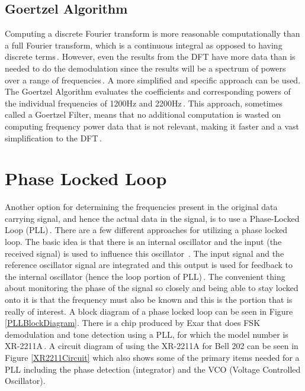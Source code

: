 \subsection{Goertzel Algorithm}
Computing a discrete Fourier transform is more reasonable computationally than a full Fourier transform, which is a continuous integral as opposed to having discrete terms\,\cite{WikipediaFT}. However, even the results from the DFT have more data than is needed to do the demodulation since the results will be a spectrum of powers over a range of frequencies\,\cite{WikipediaDFT,WikipediaFFT}. A more simplified and specific approach can be used. The Goertzel Algorithm evaluates the coefficients and corresponding powers of the individual frequencies of 1200Hz and 2200Hz\,\cite{WikipediaGA,Elmenreich2011}. This approach, sometimes called a Goertzel Filter, means that no additional computation is wasted on computing frequency power data that is not relevant, making it faster and a vast simplification to the DFT\,\cite{SanjitK1993}.

\section{Phase Locked Loop}
Another option for determining the frequencies present in the original data carrying signal, and hence the actual data in the signal, is to use a Phase-Locked Loop (PLL)\,\cite{Akoum,Perrott2009,Lutus2011}. There are a few different approaches for utilizing a phase locked loop. The basic idea is that there is an internal oscillator and the input (the received signal) is used to influence this oscillator\,\cite{Gaeddert2013} . The input signal and the reference oscillator signal are integrated and this output is used for feedback to the internal oscillator (hence the loop portion of PLL)\,\cite{Roppel}. The convenient thing about monitoring the phase of the signal so closely and being able to stay locked onto it is that the frequency must also be known and this is the portion that is really of interest. A block diagram of a phase locked loop can be seen in Figure \ref{PLLBlockDiagram}. There is a chip produced by Exar that does FSK demodulation and tone detection using a PLL, for which the model number is XR-2211A\,\cite{EXAR1997}. A circuit diagram of using the XR-2211A for Bell 202 can be seen in Figure \ref{XR2211Circuit} which also shows some of the primary items needed for a PLL including the phase detection (integrator) and the VCO (Voltage Controlled Oscillator).

